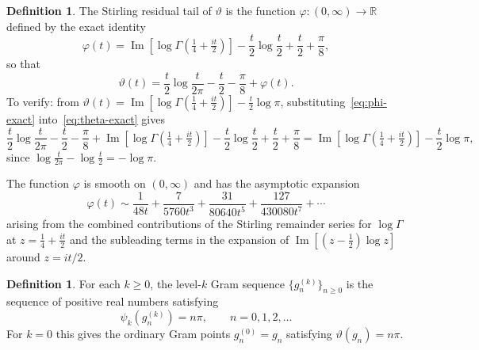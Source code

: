\documentclass[11pt]{article}
\theoremstyle{definition}
\newtheorem{definition}[theorem]{Definition}
\begin{document}
\begin{definition}
The Stirling residual tail of $\vartheta$ is the function
$\varphi\colon (0,\infty) \to \mathbb{R}$ defined by the exact identity
\begin{equation}
  \varphi(t) = \operatorname{Im}\!\left[\log\Gamma\!\left(\tfrac{1}{4}
    + \tfrac{it}{2}\right)\right]
    - \frac{t}{2}\log\frac{t}{2} + \frac{t}{2} + \frac{\pi}{8},
  \label{eq:phi-exact}
\end{equation}
so that
\begin{equation}
  \vartheta(t) = \frac{t}{2}\log\frac{t}{2\pi} - \frac{t}{2}
    - \frac{\pi}{8} + \varphi(t).
  \label{eq:theta-exact}
\end{equation}
To verify: from $\vartheta(t) = \operatorname{Im}[\log\Gamma(\tfrac{1}{4}+\tfrac{it}{2})] - \tfrac{t}{2}\log\pi$, substituting~\eqref{eq:phi-exact} into~\eqref{eq:theta-exact} gives
\begin{equation*}
  \frac{t}{2}\log\frac{t}{2\pi} - \frac{t}{2} - \frac{\pi}{8}
  + \operatorname{Im}\!\left[\log\Gamma\!\left(\tfrac{1}{4}+\tfrac{it}{2}\right)\right]
  - \frac{t}{2}\log\frac{t}{2} + \frac{t}{2} + \frac{\pi}{8}
  = \operatorname{Im}\!\left[\log\Gamma\!\left(\tfrac{1}{4}+\tfrac{it}{2}\right)\right]
  - \frac{t}{2}\log\pi,
\end{equation*}
since $\log\frac{t}{2\pi} - \log\frac{t}{2} = -\log\pi$.

The function $\varphi$ is smooth on $(0,\infty)$ and has the asymptotic
expansion
\begin{equation}
  \varphi(t) \sim \frac{1}{48t} + \frac{7}{5760t^3}
    + \frac{31}{80640t^5} + \frac{127}{430080t^7} + \cdots
  \label{eq:phi-asymp}
\end{equation}
arising from the combined contributions of the Stirling remainder
series for $\log\Gamma$ at $z = \tfrac{1}{4}+\tfrac{it}{2}$ and the
subleading terms in the expansion of
$\operatorname{Im}[(z-\tfrac{1}{2})\log z]$ around $z = it/2$.
\end{definition}

\begin{definition}
For each $k \ge 0$, the level-$k$ Gram sequence $\{g_n^{(k)}\}_{n\ge 0}$
is the sequence of positive real numbers satisfying
\begin{equation}
  \psi_k\!\left(g_n^{(k)}\right) = n\pi,
  \qquad n = 0,1,2,\ldots
  \label{eq:gram-def}
\end{equation}
For $k=0$ this gives the ordinary Gram points $g_n^{(0)} = g_n$
satisfying $\vartheta(g_n) = n\pi$.
\end{definition}
\end{document}

